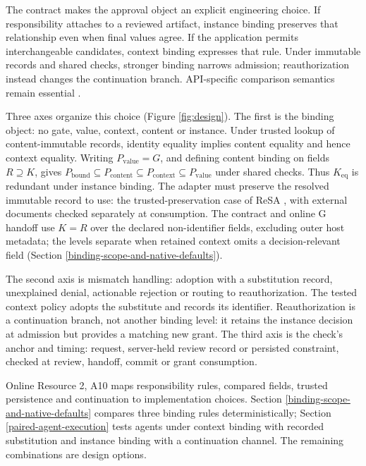 The contract makes the approval object an explicit engineering choice. If responsibility attaches to a reviewed artifact, instance binding preserves that relationship even when final values agree. If the application permits interchangeable candidates, context binding expresses that rule. Under immutable records and shared checks, stronger binding narrows admission; reauthorization instead changes the continuation branch. API-specific comparison semantics remain essential \citep{rfc9396}.

Three axes organize this choice (Figure \ref{fig:design}). The first is the binding object: no gate, value, context, content or instance. Under trusted lookup of content-immutable records, identity equality implies content equality and hence context equality. Writing \(P_{\mathrm{value}}=G\), and defining content binding on fields \(R\supseteq K\), gives \(P_{\mathrm{bound}} \subseteq P_{\mathrm{content}} \subseteq P_{\mathrm{context}} \subseteq P_{\mathrm{value}}\) under shared checks. Thus \(K_{\mathrm{eq}}\) is redundant under instance binding. The adapter must preserve the resolved immutable record to use: the trusted-preservation case of ReSA \citep{zhu2026resa}, with external documents checked separately at consumption. The contract and online G handoff use \(K=R\) over the declared non-identifier fields, excluding outer host metadata; the levels separate when retained context omits a decision-relevant field (Section \ref{binding-scope-and-native-defaults}).

The second axis is mismatch handling: adoption with a substitution record, unexplained denial, actionable rejection or routing to reauthorization. The tested context policy adopts the substitute and records its identifier. Reauthorization is a continuation branch, not another binding level: it retains the instance decision at admission but provides a matching new grant. The third axis is the check's anchor and timing: request, server-held review record or persisted constraint, checked at review, handoff, commit or grant consumption.



Online Resource 2, A10 maps responsibility rules, compared fields, trusted persistence and continuation to implementation choices. Section \ref{binding-scope-and-native-defaults} compares three binding rules deterministically; Section \ref{paired-agent-execution} tests agents under context binding with recorded substitution and instance binding with a continuation channel. The remaining combinations are design options.


